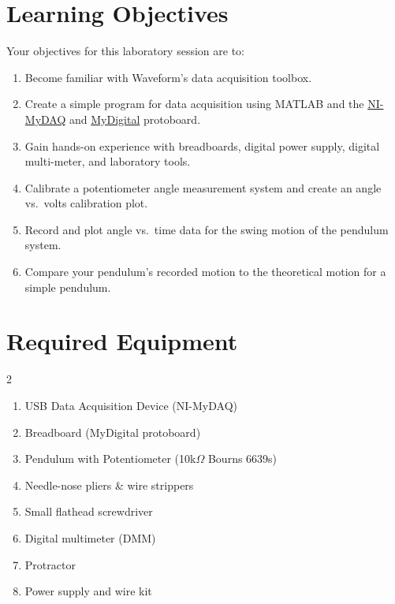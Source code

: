 \documentclass{article}
\begin{document}


\clearpage

\section{Learning Objectives}
Your objectives for this laboratory session are to:
\begin{enumerate}
    \item Become familiar with Waveform’s data acquisition toolbox.
    \item Create a simple program for data acquisition using MATLAB and the \href{https://www.ni.com/docs/en-US/bundle/mydaq-specs/page/specs.html}{NI-MyDAQ} and \href{https://www.ni.com/en-us/shop/model/digilent-mydigital.html}{MyDigital} protoboard.
    \item Gain hands-on experience with breadboards, digital power supply, digital multi-meter, and laboratory tools.
    \item Calibrate a potentiometer angle measurement system and create an angle vs.\ volts calibration plot.
    \item Record and plot angle vs.\ time data for the swing motion of the pendulum system.
    \item Compare your pendulum’s recorded motion to the theoretical motion for a simple pendulum.
\end{enumerate}

\section{Required Equipment}
\begin{multicols}{2}
\begin{enumerate}
    \item USB Data Acquisition Device (NI-MyDAQ)
    \item Breadboard (MyDigital protoboard)
    \item Pendulum with Potentiometer (10k$\Omega$ Bourns 6639s)
    \item Needle-nose pliers \& wire strippers
    \item Small flathead screwdriver
    \item Digital multimeter (DMM)
    \item Protractor
    \item Power supply and wire kit
\end{enumerate}
\end{multicols}
\end{document}
